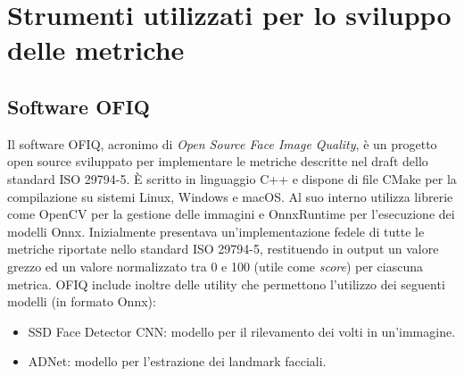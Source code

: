 \documentclass[12pt,a4paper,openright,twoside]{book}
\begin{document}
\chapter{Strumenti utilizzati per lo sviluppo delle metriche}

\section{Software OFIQ}
Il software OFIQ, acronimo di \textit{Open Source Face Image Quality}, è un progetto open source sviluppato per implementare le metriche descritte nel draft dello standard ISO 29794-5.
È scritto in linguaggio C++ e dispone di file CMake per la compilazione su sistemi Linux, Windows e macOS.
Al suo interno utilizza librerie come OpenCV per la gestione delle immagini e OnnxRuntime per l'esecuzione dei modelli Onnx.
Inizialmente presentava un'implementazione fedele di tutte le metriche riportate nello standard ISO 29794-5, restituendo in output un valore grezzo ed un valore normalizzato tra 0 e 100 (utile come \textit{score}) per ciascuna metrica.
OFIQ include inoltre delle utility che permettono l'utilizzo dei seguenti modelli (in formato Onnx): 
\begin{itemize}
    \item SSD Face Detector CNN: modello per il rilevamento dei volti in un'immagine.
    \item ADNet: modello per l'estrazione dei landmark facciali.
\end{itemize}
\end{document}

